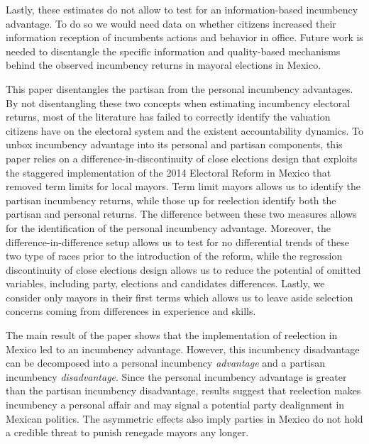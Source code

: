 \documentclass[12pt]{amsart}
\makeatletter
\def\section{\@startsection{section}{1}
	\z@{1.0\linespacing\@plus\linespacing}{.5\linespacing}{\Large}}
\numberwithin{equation}{section}
\theoremstyle{definition}
\theoremstyle{definition}
\theoremstyle{definition}
\makeatother
\begin{document}
Lastly, these estimates do not allow to test for an information-based incumbency advantage. To do so we would need data on whether citizens increased their information reception of incumbents actions and behavior in office. Future work is needed to disentangle the specific information and quality-based mechanisms behind the observed incumbency returns in mayoral elections in Mexico. 

  

\section{Conclusion} 

This paper disentangles the partisan from the personal incumbency advantages. By not disentangling these two concepts when estimating incumbency electoral returns, most of the literature has failed to correctly identify the valuation citizens have on the electoral system and the existent accountability dynamics. To unbox incumbency advantage into its personal and partisan components, this paper relies on a difference-in-discontinuity of close elections design that exploits the staggered implementation of the 2014 Electoral Reform in Mexico that removed term limits for local mayors. Term limit mayors allows us to identify the partisan incumbency returns, while those up for reelection identify both the partisan and personal returns. The difference between these two measures allows for the identification of the personal incumbency advantage. Moreover, the difference-in-difference setup allows us to test for no differential trends of these two type of races prior to the introduction of the reform, while the regression discontinuity of close elections design allows us to reduce the potential of omitted variables, including party, elections and candidates differences. Lastly, we consider only mayors in their first terms which allows us to leave aside selection concerns coming from differences in experience and skills. 

The main result of the paper shows that the implementation of reelection in Mexico led to an incumbency advantage. However, this incumbency disadvantage can be decomposed into a personal incumbency \emph{advantage} and a partisan incumbency  \emph{disadvantage}. Since the personal incumbency advantage is greater than the partisan incumbency disadvantage, results suggest that reelection makes incumbency a personal affair and may signal a potential party dealignment in Mexican politics. The asymmetric effects also imply parties in Mexico do not hold a credible threat to punish renegade mayors any longer. 
\end{document}
